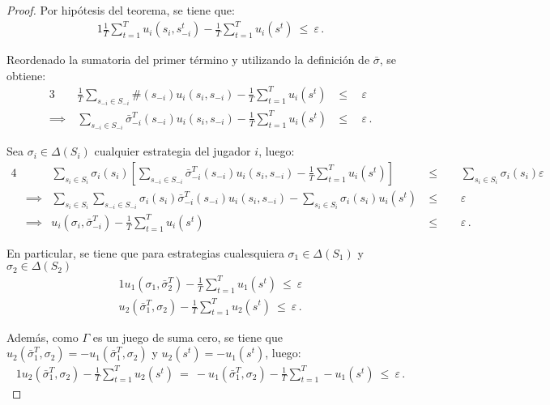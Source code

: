 \begin{proof}
Por hipótesis del teorema, se tiene que:
\begin{alignat}{1}
\frac{1}{T} \sum_{t = 1}^T u_i(s_i, s_{-i}^t) - \frac{1}{T} \sum_{t = 1}^T u_i(s^t)\ \leq\ \varepsilon \,.
\end{alignat}

Reordenado la sumatoria del primer término y utilizando la definición de $\bar\sigma$, se obtiene:
\begin{alignat}{3}
& \frac{1}{T} \sum_{s_{-i} \in S_{-i}} \#(s_{-i})u_i(s_i, s_{-i}) - \frac{1}{T} \sum_{t = 1}^Tu_i(s^t)\ & \leq\ & \ \varepsilon \\
\implies\ & \sum_{s_{-i} \in S_{-i}} \bar{\sigma}_{-i}^T(s_{-i})u_i(s_i, s_{-i}) - \frac{1}{T} \sum_{t = 1}^T u_i(s^t)\ & \leq\ & \ \varepsilon \,.
\end{alignat}

Sea $\sigma_i \in \Delta(S_i)$ cualquier estrategia del jugador $i$, luego:
\begin{alignat}{4}
& & \sum_{s_i \in S_i} \sigma_i(s_i) \left[ \sum_{s_{-i} \in S_{-i}} \bar{\sigma}_{-i}^T(s_{-i})u_i(s_i, s_{-i}) - \frac{1}{T} \sum_{t = 1}^T u_i(s^t) \right]\ & \leq\  & & \ \sum_{s_i \in S_i} \sigma_i(s_i) \varepsilon \\
& \implies & \sum_{s_i \in S_i} \sum_{s_{-i} \in S_{-i}} \sigma_i(s_i)\bar{\sigma}_{-i}^T(s_{-i}) u_i(s_i, s_{-i}) - \sum_{s_i \in S_i} \sigma_i(s_i)u_i(s^t)\ & \leq\  & & \ \varepsilon \\
& \implies & u_i(\sigma_i, \bar{\sigma}_{-i}^T) - \frac{1}{T} \sum_{t = 1}^T u_i(s^t)\ & \leq\ &  & \ \varepsilon \,.
\end{alignat}

En particular, se tiene que para estrategias cualesquiera $\sigma_1 \in \Delta(S_1)$ y $\sigma_2 \in \Delta(S_2)$
\begin{alignat}{1}
\label{eq:star1}
u_1(\sigma_1, \bar{\sigma}_2^T) - \frac{1}{T} \sum_{t=1}^T u_1(s^t)\ \leq\ \varepsilon \\
u_2(\bar{\sigma}_1^T, \sigma_2) - \frac{1}{T} \sum_{t=1}^T u_2(s^t)\ \leq\ \varepsilon \,.
\end{alignat}

Además, como $\Gamma$ es un juego de suma cero, se tiene que $u_2(\bar{\sigma}_1^T, \sigma_2) = -u_1(\bar{\sigma}_1^T, \sigma_2)$ y $u_2(s^t) = -u_1(s^t)$, luego:
\begin{alignat}{1}
u_2(\bar{\sigma}_1^T, \sigma_2) - \frac{1}{T} \sum_{t=1}^T u_2(s^t)\ =\ -u_1(\bar{\sigma}_1^T, \sigma_2) - \frac{1}{T} \sum_{t=1}^T -u_1(s^t)\ \leq\ \varepsilon \,.
\end{alignat}


\end{proof}
